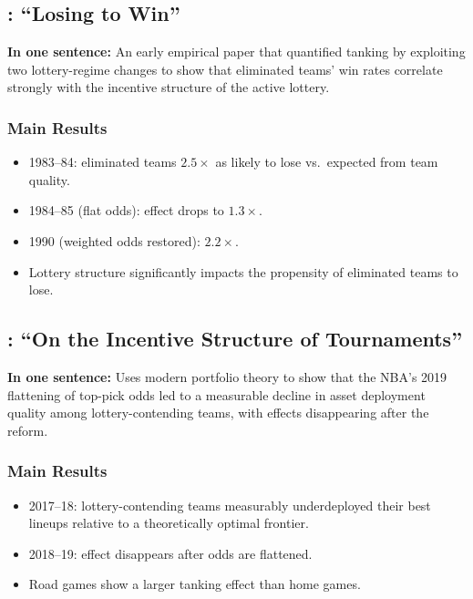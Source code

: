 \documentclass{article}
\begin{document}
\subsection{\citet{taylor2002}: ``Losing to Win''}

\textbf{In one sentence:} An early empirical paper that quantified tanking
by exploiting two lottery-regime changes to show that eliminated teams' win
rates correlate strongly with the incentive structure of the active lottery.

\subsubsection*{Main Results}
\begin{itemize}
    \item 1983--84: eliminated teams $2.5\times$ as likely to lose vs.\
    expected from team quality.
    \item 1984--85 (flat odds): effect drops to $1.3\times$.
    \item 1990 (weighted odds restored): $2.2\times$.
    \item Lottery structure significantly impacts the propensity of eliminated
    teams to lose.
\end{itemize}

\subsection{\citet{schmidt2024}: ``On the Incentive Structure of Tournaments''}

\textbf{In one sentence:} Uses modern portfolio theory to show that the NBA's
2019 flattening of top-pick odds led to a measurable decline in asset
deployment quality among lottery-contending teams, with effects disappearing
after the reform.

\subsubsection*{Main Results}
\begin{itemize}
    \item 2017--18: lottery-contending teams measurably underdeployed their
    best lineups relative to a theoretically optimal frontier.
    \item 2018--19: effect disappears after odds are flattened.
    \item Road games show a larger tanking effect than home games.
\end{itemize}
\end{document}
